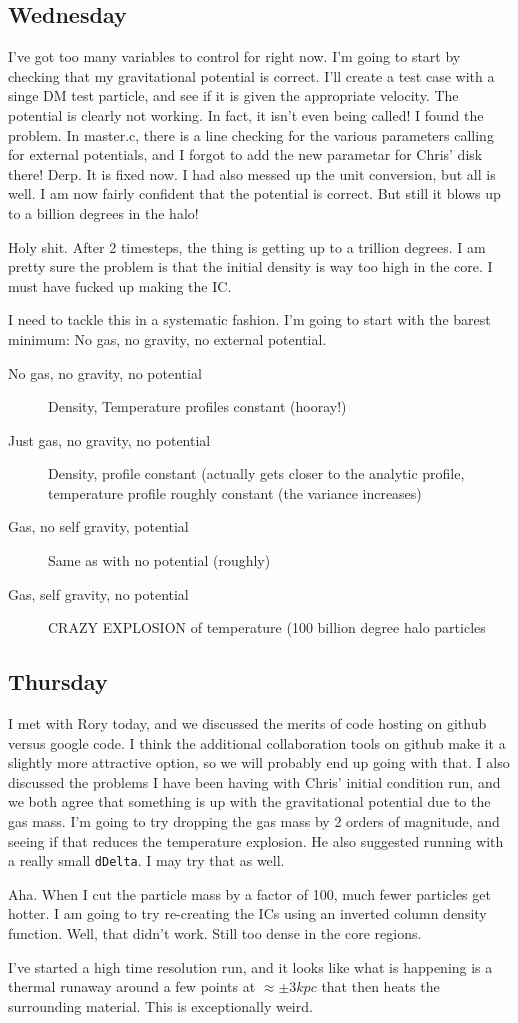 \documentclass[11pt,letterpaper]{article}
\begin{document}
\subsection*{Wednesday}
I've got too many variables to control for right now.  I'm going to start by
checking that my gravitational potential is correct.  I'll create a test 
case with a singe DM test particle, and see if it is given the appropriate 
velocity.  The potential is clearly not working.  In fact, it isn't even being
called!  I found the problem.  In master.c, there is a line checking for the
various parameters calling for external potentials, and I forgot to add the new
parametar for Chris' disk there! Derp.  It is fixed now.  I had also messed up
the unit conversion, but all is well.  I am now fairly confident that the 
potential is correct.  But still it blows up to a billion degrees in the halo!

Holy shit. After 2 timesteps, the thing is getting up to a trillion degrees.  
I am pretty sure the problem is that the initial density is way too high in
the core.  I must have fucked up making the IC.

I need to tackle this in a systematic fashion.  I'm going to start with the
barest minimum: No gas, no gravity, no external potential.
\begin{description}
\item[No gas, no gravity, no potential] Density, Temperature profiles constant (hooray!)
\item[Just gas, no gravity, no potential] Density, profile constant (actually 
gets closer to the analytic profile, temperature profile roughly constant 
(the variance increases)
\item[Gas, no self gravity, potential] Same as with no potential (roughly)
\item[Gas, self gravity, no potential] CRAZY EXPLOSION of temperature (100 
billion degree halo particles
\end{description}
\subsection*{Thursday}
I met with Rory today, and we discussed the merits of code hosting on github 
versus google code.  I think the additional collaboration tools on github make 
it a slightly more attractive option, so we will probably end up going with 
that.  I also discussed the problems I have been having with Chris' initial
condition run, and we both agree that something is up with the gravitational
potential due to the gas mass.  I'm going to try dropping the gas mass by 2 
orders of magnitude, and seeing if that reduces the temperature explosion. He 
also suggested running with a really small \verb!dDelta!.  I may try that as 
well.

Aha.  When I cut the particle mass by a factor of 100, much fewer particles
get hotter.  I am going to try re-creating the ICs using an inverted column 
density function.  Well, that didn't work.  Still too dense in the core regions.

I've started a high time resolution run, and it looks like what is happening is 
a thermal runaway around a few points at $\approx\pm3 kpc$ that then heats the
surrounding material. This is exceptionally weird.
\end{document}

